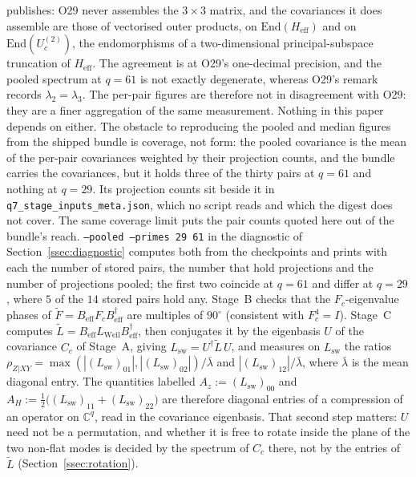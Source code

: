 \documentclass[11pt,a4paper]{article}
\newcommand{\Heff}{H_{\mathrm{eff}}}
\begin{document}
    publishes: O29 never assembles the $3 \times 3$ matrix, and the covariances it does assemble are
    those of vectorised outer products, on $\mathrm{End}(\Heff)$ and on
    $\mathrm{End}(U^{(2)}_c)$, the endomorphisms of a two-dimensional principal-subspace truncation
    of $\Heff$.
    The agreement is at O29's one-decimal precision, and the pooled spectrum at $q = 61$ is not
    exactly degenerate, whereas O29's remark records $\lambda_2 = \lambda_3$.
    The per-pair figures are therefore not in disagreement with O29: they are a finer aggregation of
    the same measurement. Nothing in this paper depends on either.
    The obstacle to reproducing the pooled and median figures from the shipped bundle is coverage,
    not form: the pooled covariance is the mean of the per-pair covariances weighted by their
    projection counts, and the bundle carries the covariances, but it holds three of the thirty
    pairs at $q = 61$ and nothing at $q = 29$.
    Its projection counts sit beside it in \texttt{q7\_stage\_inputs\_meta.json}, which no script
    reads and which the digest does not cover.
    The same coverage limit puts the pair counts quoted here out of the bundle's reach.
    \texttt{--pooled --primes 29 61} in the diagnostic of Section~\ref{ssec:diagnostic} computes
    both from the checkpoints and prints with each the number of stored pairs, the number that hold
    projections and the number of projections pooled; the first two coincide at $q = 61$ and differ
    at $q = 29$, where $5$ of the $14$ stored pairs hold any.
    Stage~B checks that the $F_c$-eigenvalue phases of $\tilde{F} = B_{\mathrm{eff}} F_c B_{\mathrm{eff}}^\dagger$
    are multiples of $90^\circ$ (consistent with $F_c^4 = I$).
    Stage~C computes $\tilde{L} = B_{\mathrm{eff}} L_{\mathrm{Weil}} B_{\mathrm{eff}}^\dagger$,
    then conjugates it by the eigenbasis $U$ of the covariance $C_c$ of Stage~A, giving
    $L_{\mathrm{sw}} = U^\dagger \tilde L\, U$, and measures on $L_{\mathrm{sw}}$ the ratios
    $\rho_{Z|XY} = \max(|(L_{\mathrm{sw}})_{01}|, |(L_{\mathrm{sw}})_{02}|)/\bar\lambda$ and
    $|(L_{\mathrm{sw}})_{12}|/\bar\lambda$, where $\bar\lambda$ is the mean diagonal entry.
    The quantities labelled $A_z := (L_{\mathrm{sw}})_{00}$ and
    $A_H := \tfrac12\bigl((L_{\mathrm{sw}})_{11} + (L_{\mathrm{sw}})_{22}\bigr)$ are therefore
    diagonal entries of a compression of an operator on $\mathbb{C}^q$, read in the covariance
    eigenbasis.
    That second step matters: $U$ need not be a permutation, and whether it is free to rotate inside
    the plane of the two non-flat modes is decided by the spectrum of $C_c$ there, not by the
    entries of $\tilde L$ (Section~\ref{ssec:rotation}).
\end{document}
